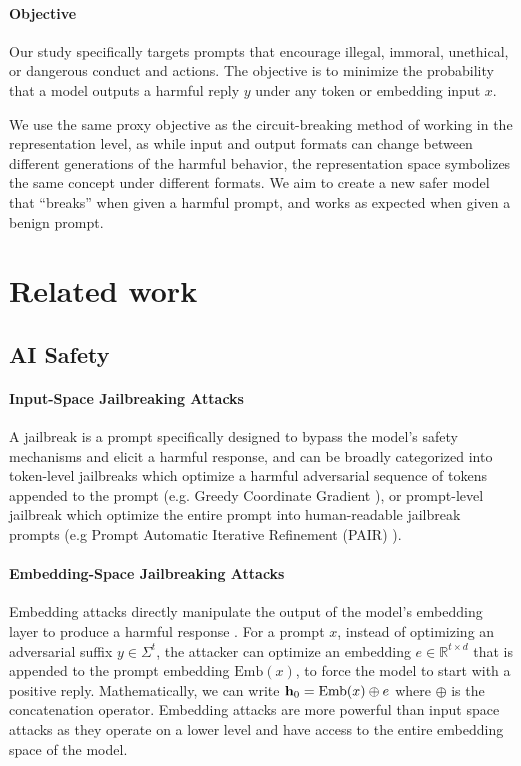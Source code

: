 \documentclass[11pt]{article}
\begin{document}
\paragraph{Objective}
Our study specifically targets prompts that encourage illegal, immoral, unethical, or dangerous conduct and actions.
The objective is to minimize the probability that a model outputs a harmful reply $y$ under any token or embedding input $x$.

We use the same proxy objective as the circuit-breaking method of working in the representation level, as while input and output formats can change between different generations of the harmful behavior, the representation space symbolizes the same concept under different formats. We aim to create a new safer model that ``breaks'' when given a harmful prompt, and works as expected when given a benign prompt.

\section{Related work}
\subsection{AI Safety}
\paragraph{Input-Space Jailbreaking Attacks}
A jailbreak is a prompt specifically designed to bypass the model's safety mechanisms and elicit a harmful response,
and can be broadly categorized into token-level jailbreaks which optimize a harmful 
adversarial sequence of tokens appended to the prompt (e.g. Greedy Coordinate Gradient \citep{zou2023universaltransferableadversarialattacks}), or prompt-level jailbreak which
optimize the entire prompt into human-readable jailbreak prompts (e.g Prompt Automatic Iterative Refinement (PAIR) \citep{chao2024jailbreakingblackboxlarge}).

\paragraph{Embedding-Space Jailbreaking Attacks}
Embedding attacks directly manipulate the output of the model's embedding layer to produce a harmful response \citep{schwinn2025softpromptthreatsattacking}. For a prompt $x$, instead of optimizing an adversarial suffix $y \in \Sigma^t$, the attacker can optimize an embedding $e \in \mathbb{R}^{t \times d}$
that is appended to the prompt embedding $\mathrm{Emb}(x)$, to force the model to start with a positive reply. Mathematically, we can write $\textbf{h}_0 = \mathrm{Emb}(x) \oplus e$ where $\oplus$ is the concatenation operator.
Embedding attacks are more powerful than input space attacks as they operate on a lower level and have access to the entire embedding space of the model.
\end{document}
